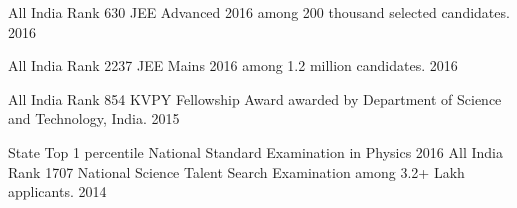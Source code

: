 \begin{cvhonors}
	\cvhonor
		{All India Rank 630}
		{JEE Advanced 2016 among 200 thousand selected candidates.}
		{}
		{2016}

	\cvhonor
		{All India Rank 2237}
		{JEE Mains 2016 among 1.2 million candidates.}
		{}
		{2016}

	\cvhonor
		{All India Rank 854}
		{KVPY Fellowship Award awarded by Department of Science and Technology, India.}
		{}
		{2015}

	\cvhonor
		{State Top 1 percentile}{
			National Standard Examination in Physics
		}
		{}
		{2016}
	\cvhonor
		{All India Rank 1707}
		{National Science Talent Search Examination among 3.2+ Lakh applicants.}
		{}
		{2014}

\end{cvhonors}

